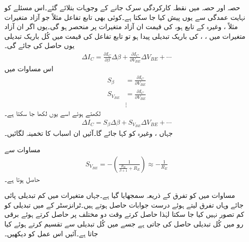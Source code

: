 حصہ   اور حصہ   میں نقطہ کارکردگی سرک جانے کے وجوہات بتلائے گئے۔اس مسئلے کو نہایت عمدگی سے یوں پیش کیا جا سکتا ہے۔کوئی بھی تابع تفاعل مثلاً   جو آزاد متغیرات مثلاً ،  وغیرہ کے تابع ہو، کی قیمت ان آزاد متغیرات پر منحصر ہو گی۔یوں اگر ان آزاد متغیرات میں ، ،  کی باریک تبدیلی پیدا ہو تو تابع تفاعل کی قیمت میں کُل باریک تبدیلی یوں حاصل کی جائے گی۔
\begin{align}
\Delta I_C=\frac{\partial I_C}{\partial \beta} \Delta \beta +\frac{\partial I_C}{ \partial V_{BE}} \Delta V_{BE} +\cdots
\end{align}
اس مساوات میں
\begin{align} \label{مساوات_ٹرانزسٹر_سوارنے_اسباب_الف}
S_{\beta}&=\frac{\partial I_C}{\partial V_{BE}}\\
S_{V_{BE}}&=\frac{\partial I_C}{\partial V_{BE}}\\
&\vdots \nonumber
\end{align}
لکھتے ہوئے اسے یوں لکھا جا سکتا ہے۔
\begin{align} \label{مساوات_ٹرانزسٹر_اسباب_تفرق_مساوات}
\Delta I_C = S_{\beta} \Delta \beta+S_{V_{BE}} \Delta V_{BE} +\cdots
\end{align}
جہاں  ،  وغیرہ کو   کہا جائے گا۔آئیں ان اسباب کا تخمینہ لگائیں۔

مساوات   سے 
\begin{align}\label{مساوات_ٹرانزسٹر_قابو_دباو_اسباب}
S_{V_{BE}}=-\left ( \frac{1}{\frac{R_B}{\beta+1}+R_E} \right ) \approx -\frac{1}{R_E}
\end{align}
حاصل ہوتا ہے۔

مساوات  میں  کو تفرق کے ذریعہ سمجھایا گیا ہے۔جہاں متغیرات میں کم تبدیلی پائی جائے وہاں تفرق لیتے ہوئے درست جوابات حاصل ہوتے ہیں۔ٹرانزسٹر کے  میں تبدیلی کو کم تصور نہیں کیا جا سکتا لہٰذا  حاصل کرتے وقت دو مختلف  پر  حاصل کرتے ہوئے برقی رو میں کُل تبدیلی  حاصل کی جاتی ہے جسے  میں کُل تبدیلی  سے تقسیم کرتے ہوئے   کیا جاتا ہے۔آئیں اس عمل کو دیکھیں۔

